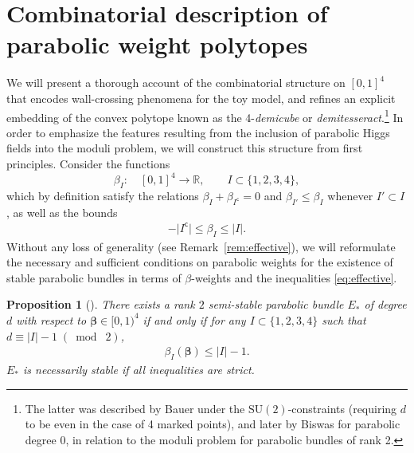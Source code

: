 \documentclass[pdftex]{sigma}
\newcommand{\field}[1]{\ensuremath{\mathbb{#1}}}
\newcommand{\RR}{\field{R}}
\numberwithin{equation}{section}
\newtheorem{Proposition}[Theorem]{Proposition}
 { \theoremstyle{definition}
\newtheorem{Definition}[Theorem]{Definition}
\newtheorem{Note}[Theorem]{Note}
\newtheorem{Example}[Theorem]{Example}
\newtheorem{Remark}[Theorem]{Remark} }
\begin{document}
\section{Combinatorial description of parabolic weight polytopes}\label{sec:poly}


We will present a thorough account of the combinatorial structure on $[0,1]^{4}$ that encodes wall-crossing phenomena for the toy model, and refines an explicit embedding of the convex polytope known as the 4-\textit{demicube} or \textit{demitesseract}.\footnote{The latter was described by Bauer \cite{Bau91} under the $\mathrm{SU}(2)$-constraints (requiring $d$ to be even in the case of 4 marked points), and later by Biswas \cite{Bis98} for parabolic degree 0, in relation to the moduli problem for parabolic bundles of rank 2.} In order to emphasize the features resulting from the inclusion of parabolic Higgs fields into the moduli problem, we will construct this structure from first principles. Consider the functions
\[
\beta_{I}\colon\quad [0,1]^{4}\rightarrow \RR,\qquad I\subset\{1,2,3,4\},
\]
which by definition satisfy the relations $\beta_{I}+\beta_{I^{\mathsf{c}}}=0$ and $\beta_{I'}\leq \beta_{I}$ whenever $I'\subset I$, as well as the bounds
\begin{gather}\label{eq:bounds}
-\vert I^{\mathsf{c}}\vert \leq \beta_{I}\leq \vert I\vert.
\end{gather}
Without any loss of generality (see Remark~\ref{rem:effective}), we will reformulate the necessary and sufficient conditions on parabolic weights for the existence of stable parabolic bundles in terms of $\beta$-weights and the inequalities \eqref{eq:effective}.

\begin{Proposition}[\cite{Bau91, Bis98}]\label{prop:B-B}
There exists a rank $2$ semi-stable parabolic bundle $E_{*}$ of degree $d$ with respect to $\pmb{\beta}\in[0,1)^{4}$ if and only if for any $I\subset\{1,2,3,4\}$ such that $d \equiv \vert I\vert -1\; (\bmod\; 2)$,
\begin{gather}\label{eq:Biswas-ineq}
 \beta_{I}(\pmb{\beta}) \leq \vert I\vert-1.
\end{gather}
$E_{*}$ is necessarily stable if all inequalities are strict.
\end{Proposition}
\end{document}
